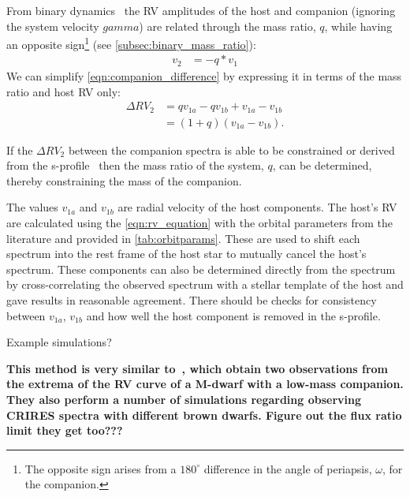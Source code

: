 From binary dynamics~\citep[e.g.][]{murray_keplerian_2010} the {RV} amplitudes of the host and companion (ignoring the system velocity $gamma$) are related through the mass ratio, \(q\), while having an opposite sign\footnote{The opposite sign arises from a \(180^\circ\) difference in the angle of periapsis, \(\omega\), for the companion.} (see \cref{subsec:binary_mass_ratio}): 
\begin{align}
v_{2} &= -q * v_{1} \label{eqn:q_relation}
\end{align}
We can simplify \cref{eqn:companion_difference} by expressing it in terms of the mass ratio and host {RV} only:
\begin{align}
\Delta RV_2 &= q v_{1a} - q v_{1b} + v_{1a} - v_{1b} \nonumber \\
&= (1 + q)(v_{1a} - v_{1b}). \label{eqn:companion_difference_simplified}
\end{align}

If the \(\Delta {RV}_2\) between the companion spectra is able to be constrained or derived from the s-profile~\citep[see][]{ferluga_separating_1997} then the mass ratio of the system, \(q\), can be determined, thereby constraining the mass of the companion.

The values \(v_{1a}\) and \(v_{1b}\) are radial velocity of the host components.
The host's RV are calculated using the \cref{eqn:rv_equation} with the orbital parameters from the literature and provided in \cref{tab:orbitparams}.
These are used to shift each spectrum into the rest frame of the host star to mutually cancel the host's spectrum.
These components can also be determined directly from the spectrum by cross-correlating the observed spectrum with a stellar template of the host and gave results in reasonable agreement.
There should be checks for consistency between \(v_{1a}\), \(v_{1b}\) and how well the host component is removed in the s-profile.

Example simulations?

\textbf{This method is very similar to~\citet{kostogryz_spectral_2013}, which obtain two observations from the extrema of the RV curve of a M-dwarf with a low-mass companion.
They also perform a number of simulations regarding observing {CRIRES} spectra with different brown dwarfs.
Figure out the flux ratio limit they get too???}

